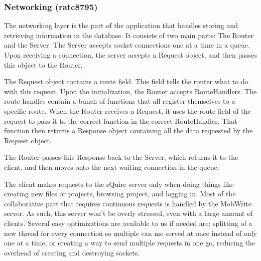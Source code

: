 \documentclass[twoside,letterpaper]{article}
\begin{document}
\subsubsection{Networking (ratc8795)}
The networking layer is the part of the application that handles storing and retrieving information in the database. It consists of two main parts: The Router and the Server. The Server accepts socket connections one at a time in a queue. Upon receiving a connection, the server accepts a Request object, and then passes this object to the Router.

The Request object contains a route field. This field tells the router what to do with this request. Upon the initialization, the Router accepts RouteHandlers. The route handles contain a bunch of functions that all register themselves to a specific route. When the Router receives a Request, it uses the route field of the request to pass it to the correct function in the correct RouteHandler. That function then returns a Response object containing all the data requested by the Request object.

The Router passes this Response back to the Server, which returns it to the client, and then moves onto the next waiting connection in the queue.

The client makes requests to the sQuire server only when doing things like creating new files or projects, browsing project, and logging in. Most of the collaborative part that requires continuous requests is handled by the MobWrite server. As such, this server won't be overly stressed, even with a large amount of clients. Several easy optimizations are available to us if needed are: splitting of a new thread for every connection so multiple can me served at once instead of only one at a time, or creating a way to send multiple requests in one go, reducing the overhead of creating and destroying sockets.
\end{document}
